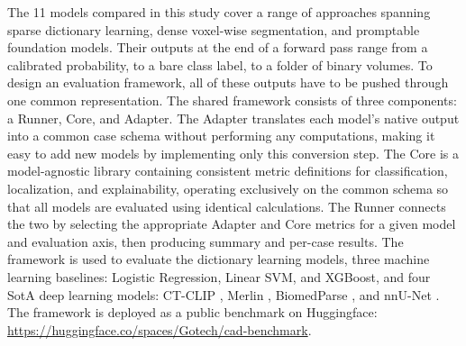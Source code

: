 \documentclass{article}
\begin{document}
The 11 models compared in this study cover a range of approaches spanning sparse dictionary learning, dense voxel-wise
segmentation, and promptable foundation models. Their outputs at the end of a forward pass range from a calibrated
probability, to a bare class label, to a folder of binary volumes. To design an evaluation framework, all of these outputs have
to be pushed through one common representation. The shared framework consists of three components: a Runner, Core, and
Adapter. The Adapter translates each model's native output into a common case schema without performing any computations,
making it easy to add new models by implementing only this conversion step. The Core is a model-agnostic library
containing consistent metric definitions for classification, localization, and explainability, operating exclusively on the
common schema so that all models are evaluated using identical calculations. The Runner connects the two by selecting the
appropriate Adapter and Core metrics for a given model and evaluation axis, then producing summary and per-case results.
The framework is used to evaluate the dictionary learning models, three machine learning baselines: Logistic Regression,
Linear SVM, and XGBoost, and four SotA deep learning models: CT-CLIP \cite{hamamci2024ctclip}, Merlin \cite{Blankemeier2026},
BiomedParse \cite{zhao2025foundation}, and nnU-Net \cite{isensee2021nnu}.
The framework is deployed as a public benchmark on Huggingface: \url{https://huggingface.co/spaces/Gotech/cad-benchmark}.
\end{document}
